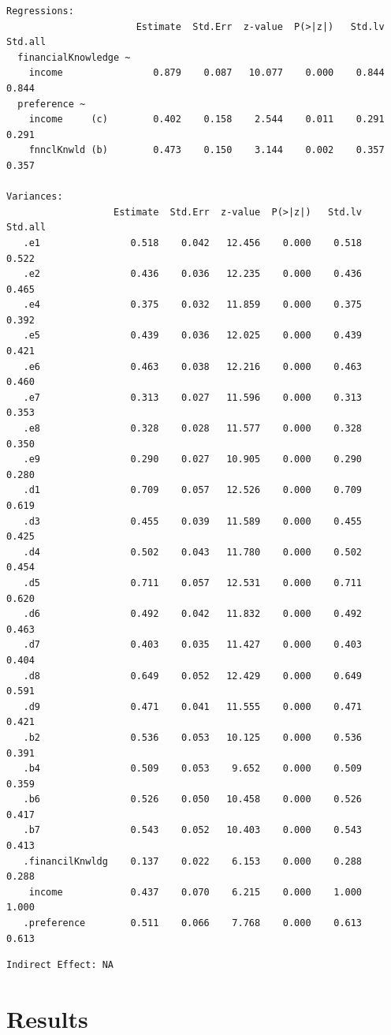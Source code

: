 \documentclass[
  super,
  preprint,
  3p]{elsarticle}
\begin{document}
\begin{verbatim}
Regressions:
                       Estimate  Std.Err  z-value  P(>|z|)   Std.lv  Std.all
  financialKnowledge ~                                                      
    income                0.879    0.087   10.077    0.000    0.844    0.844
  preference ~                                                              
    income     (c)        0.402    0.158    2.544    0.011    0.291    0.291
    fnnclKnwld (b)        0.473    0.150    3.144    0.002    0.357    0.357

Variances:
                   Estimate  Std.Err  z-value  P(>|z|)   Std.lv  Std.all
   .e1                0.518    0.042   12.456    0.000    0.518    0.522
   .e2                0.436    0.036   12.235    0.000    0.436    0.465
   .e4                0.375    0.032   11.859    0.000    0.375    0.392
   .e5                0.439    0.036   12.025    0.000    0.439    0.421
   .e6                0.463    0.038   12.216    0.000    0.463    0.460
   .e7                0.313    0.027   11.596    0.000    0.313    0.353
   .e8                0.328    0.028   11.577    0.000    0.328    0.350
   .e9                0.290    0.027   10.905    0.000    0.290    0.280
   .d1                0.709    0.057   12.526    0.000    0.709    0.619
   .d3                0.455    0.039   11.589    0.000    0.455    0.425
   .d4                0.502    0.043   11.780    0.000    0.502    0.454
   .d5                0.711    0.057   12.531    0.000    0.711    0.620
   .d6                0.492    0.042   11.832    0.000    0.492    0.463
   .d7                0.403    0.035   11.427    0.000    0.403    0.404
   .d8                0.649    0.052   12.429    0.000    0.649    0.591
   .d9                0.471    0.041   11.555    0.000    0.471    0.421
   .b2                0.536    0.053   10.125    0.000    0.536    0.391
   .b4                0.509    0.053    9.652    0.000    0.509    0.359
   .b6                0.526    0.050   10.458    0.000    0.526    0.417
   .b7                0.543    0.052   10.403    0.000    0.543    0.413
   .financilKnwldg    0.137    0.022    6.153    0.000    0.288    0.288
    income            0.437    0.070    6.215    0.000    1.000    1.000
   .preference        0.511    0.066    7.768    0.000    0.613    0.613
\end{verbatim}

\begin{verbatim}
Indirect Effect: NA 
\end{verbatim}

\hypertarget{results}{%
\section{Results}\label{results}}
\end{document}
